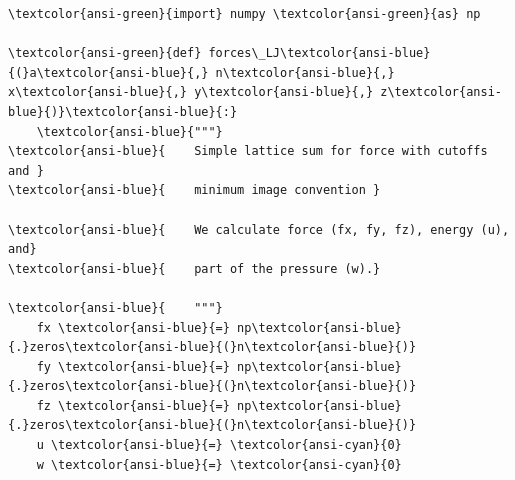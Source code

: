 \documentclass[11pt]{article}
\begin{document}
    
    \begin{Verbatim}[commandchars=\\\{\}]
\textcolor{ansi-green}{import} numpy \textcolor{ansi-green}{as} np

\textcolor{ansi-green}{def} forces\_LJ\textcolor{ansi-blue}{(}a\textcolor{ansi-blue}{,} n\textcolor{ansi-blue}{,} x\textcolor{ansi-blue}{,} y\textcolor{ansi-blue}{,} z\textcolor{ansi-blue}{)}\textcolor{ansi-blue}{:}
    \textcolor{ansi-blue}{"""}
\textcolor{ansi-blue}{    Simple lattice sum for force with cutoffs and }
\textcolor{ansi-blue}{    minimum image convention }

\textcolor{ansi-blue}{    We calculate force (fx, fy, fz), energy (u), and}
\textcolor{ansi-blue}{    part of the pressure (w).}

\textcolor{ansi-blue}{    """}
    fx \textcolor{ansi-blue}{=} np\textcolor{ansi-blue}{.}zeros\textcolor{ansi-blue}{(}n\textcolor{ansi-blue}{)}
    fy \textcolor{ansi-blue}{=} np\textcolor{ansi-blue}{.}zeros\textcolor{ansi-blue}{(}n\textcolor{ansi-blue}{)}
    fz \textcolor{ansi-blue}{=} np\textcolor{ansi-blue}{.}zeros\textcolor{ansi-blue}{(}n\textcolor{ansi-blue}{)}
    u \textcolor{ansi-blue}{=} \textcolor{ansi-cyan}{0}
    w \textcolor{ansi-blue}{=} \textcolor{ansi-cyan}{0}


\end{Verbatim}
\end{document}

